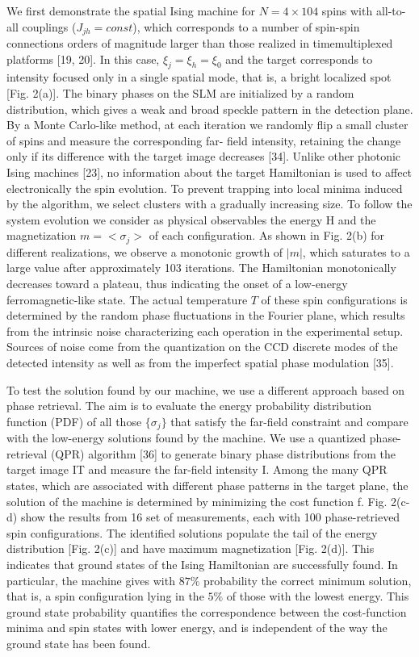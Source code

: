 We first demonstrate the spatial Ising machine for $N = 4\times 104$ spins with all-to-all couplings ($J_{jh} = const$), which corresponds to a number of spin-spin connections orders of magnitude larger than those realized in timemultiplexed platforms [19, 20]. In this case, $\xi_j = \xi_h = \xi_0$ and the target corresponds to intensity focused only in a single spatial mode, that is, a bright localized spot [Fig. 2(a)]. The binary phases on the SLM are initialized by a random distribution, which gives a weak and broad speckle pattern in the detection plane. By a Monte Carlo-like method, at each iteration we randomly  flip a small cluster of spins and measure the corresponding far- field intensity, retaining the change only if its difference with the target image decreases [34]. Unlike other photonic Ising machines [23], no information about the target Hamiltonian is used to affect electronically the spin evolution. To prevent trapping into local minima induced by the algorithm, we select clusters with a gradually increasing size. To follow the system evolution we consider as physical observables the energy H and the magnetization $m = <\sigma_j>$ of each configuration. As shown in Fig. 2(b) for different realizations, we observe a monotonic growth of $|m|$, which saturates to a large value after approximately 103 iterations. The Hamiltonian monotonically decreases toward a plateau, thus indicating the onset of a low-energy ferromagnetic-like state. The actual temperature $T$ of these spin configurations is determined by the random phase  fluctuations in the Fourier plane, which results from the intrinsic noise characterizing each operation in the experimental setup. Sources of noise come from the quantization on the CCD discrete modes of the detected intensity as well as from the imperfect spatial phase modulation [35].

To test the solution found by our machine, we use a different approach based on phase retrieval. The aim is to evaluate the energy probability distribution function (PDF) of all those $\{\sigma_j\}$ that satisfy the far-field constraint and compare with the low-energy solutions found by the machine. We use a quantized phase-retrieval (QPR) algorithm [36] to generate binary phase distributions from the target image IT and measure the far-field intensity I. Among the many QPR states, which are associated with different phase patterns in the target plane, the solution of the machine is determined by minimizing the cost function f. Fig. 2(c-d) show the results from 16 set of measurements, each with 100 phase-retrieved spin configurations. The identified solutions populate the tail of the energy distribution [Fig. 2(c)] and have maximum magnetization [Fig. 2(d)]. This indicates that ground states of the Ising Hamiltonian are successfully found. In particular, the machine gives with $87\%$ probability the correct minimum solution, that is, a spin configuration lying in the $5\%$ of those with the lowest energy. This ground state probability quantifies the correspondence between the cost-function minima and spin states with lower energy, and is independent of the way the ground state has been found.

